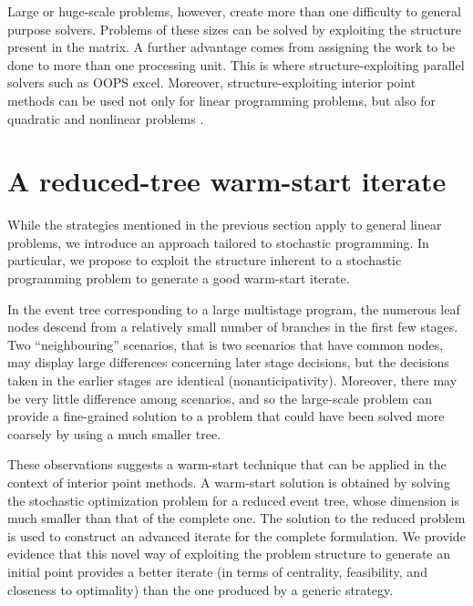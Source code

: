 \hrulefill

Large or huge-scale problems, however, create more than one difficulty 
to general purpose solvers. Problems of these sizes can be solved by 
exploiting the structure present in the matrix. A further advantage 
comes from assigning the work to be done to more than one processing unit. 
This is where structure-exploiting parallel solvers such as OOPS 
\cite{GondzioSarkissian} excel. Moreover, structure-exploiting interior 
point methods can be used not only for linear programming problems, 
but also for quadratic and nonlinear problems \cite{GondzioGrothey04}.


%
%
\section{A reduced-tree warm-start iterate}
\label{sec:ReducedTree}

While the strategies mentioned in the previous section apply to
general linear problems, we introduce an approach tailored to
stochastic programming. In particular, we propose to exploit the structure
inherent to a stochastic programming problem to generate a good 
warm-start iterate.

In the event tree corresponding to a large multistage program, 
the numerous leaf nodes descend from a relatively small number of 
branches in the first few stages. Two ``neighbouring'' scenarios, 
that is two scenarios that have common nodes, may display large 
differences concerning later stage decisions, but the decisions 
taken in the earlier stages are identical (nonanticipativity).
Moreover, there may be very little difference among 
scenarios, and so the large-scale problem can provide a fine-grained 
solution to a problem that could have been solved more coarsely by 
using a much smaller tree. 

These observations suggests a
warm-start technique that can be applied in the context of interior 
point methods. A warm-start solution is obtained by solving the 
stochastic optimization problem for a reduced event tree, whose 
dimension is much smaller than that of the complete one. The solution 
to the reduced problem is used to construct an advanced iterate for 
the complete formulation. We provide evidence that this novel way 
of exploiting the problem structure to generate an initial point 
provides a better iterate (in terms of centrality, feasibility, 
and closeness to optimality) than the one produced by a generic 
strategy.

